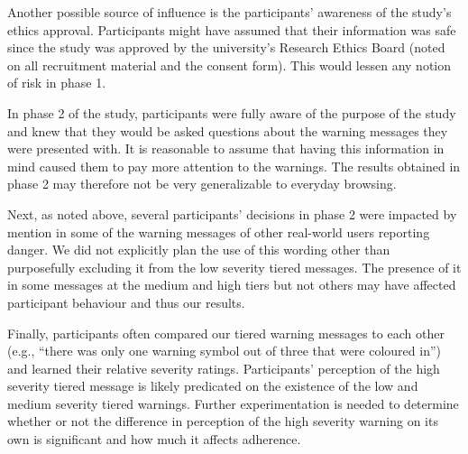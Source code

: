 Another possible source of influence is the participants' awareness of the study's ethics approval. Participants might have assumed that their information was safe since the study was approved by the university's Research Ethics Board (noted on all recruitment material and the consent form). This would lessen any notion of risk in phase 1.

In phase 2 of the study, participants were fully aware of the purpose of the study and knew that they would be asked questions about the warning messages they were presented with. It is reasonable to assume that having this information in mind caused them to pay more attention to the warnings. The results obtained in phase 2 may therefore not be very generalizable to everyday browsing.

Next, as noted above, several participants' decisions in phase 2 were impacted by mention in some of the warning messages of other real-world users reporting danger. We did not explicitly plan the use of this wording other than purposefully excluding it from the low severity tiered messages. The presence of it in some messages at the medium and high tiers but not others may have affected participant behaviour and thus our results.

Finally, participants often compared our tiered warning messages to each other (e.g., ``there was only one warning symbol out of three that were coloured in'') and learned their relative severity ratings. Participants' perception of the high severity tiered message is likely predicated on the existence of the low and medium severity tiered warnings. Further experimentation is needed to determine whether or not the difference in perception of the high severity warning on its own is significant and how much it affects adherence.
